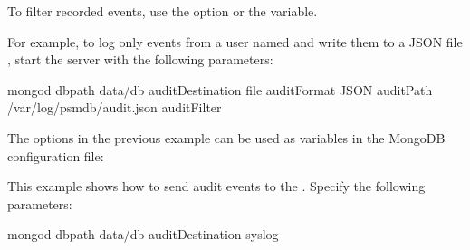 \documentclass[letterpaper,10pt,english]{sphinxmanual}
\begin{document}
\sphinxAtStartPar
To filter recorded events, use the {\hyperref[\detokenize{audit-logging:cmdoption-auditFilter}]{}} option
or the  variable.

\sphinxAtStartPar
For example, to log only events from a user named 
and write them to a JSON file ,
start the server with the following parameters:

\begin{sphinxVerbatim}[commandchars=\\\{\}]
mongod 
 \PYGZhy{}\PYGZhy{}dbpath data/db
 \PYGZhy{}\PYGZhy{}auditDestination file 
 \PYGZhy{}\PYGZhy{}auditFormat JSON 
 \PYGZhy{}\PYGZhy{}auditPath /var/log/psmdb/audit.json 
 \PYGZhy{}\PYGZhy{}auditFilter 
\end{sphinxVerbatim}

\sphinxAtStartPar
The options in the previous example can be used as variables
in the MongoDB configuration file:

\begin{sphinxVerbatim}[commandchars=\\\{\}]
   
   
   
   
   
\end{sphinxVerbatim}

\sphinxAtStartPar
This example shows how to send audit events to the
. Specify the following parameters:

\begin{sphinxVerbatim}[commandchars=\\\{\}]
mongod 
\PYGZhy{}\PYGZhy{}dbpath data/db
\PYGZhy{}\PYGZhy{}auditDestination syslog 
\end{sphinxVerbatim}
\end{document}
